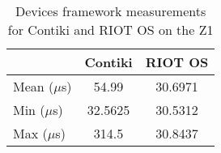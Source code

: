 \begin{table}[!ht]
  \centering
  \begin{tabular}{l|c|c}
                & Contiki  & RIOT OS \\ \hline
  Mean ($\mu$s) & 54.99    & 30.6971 \\
  Min  ($\mu$s) & 32.5625  & 30.5312 \\
  Max  ($\mu$s) & 314.5    & 30.8437
  \end{tabular}
  \caption{Devices framework measurements for Contiki and RIOT OS on the Z1}
  \label{tab:devices-framework-z1}
  \end{table}